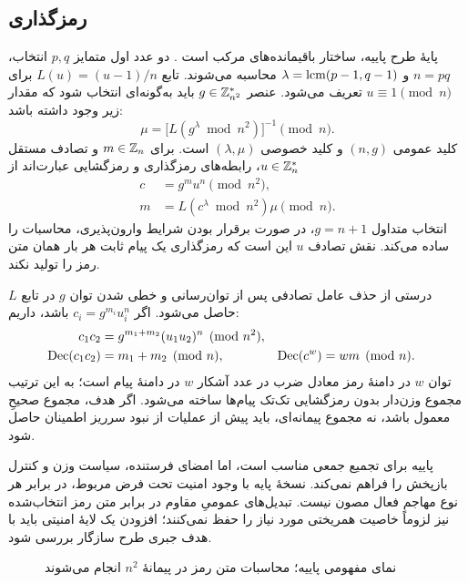 \subsection{رمزگذاری }
پایۀ طرح پاییه، ساختار باقیمانده‌های مرکب است \cite{ref179}. دو عدد اول متمایز $p,q$ انتخاب، $n=pq$ و $\lambda=\operatorname{lcm}(p-1,q-1)$ محاسبه می‌شوند. تابع $L(u)=(u-1)/n$ برای $u\equiv1\pmod n$ تعریف می‌شود. عنصر $g\in\mathbb{Z}_{n^2}^{*}$ باید به‌گونه‌ای انتخاب شود که مقدار زیر وجود داشته باشد:
\begin{equation}
\mu=\bigl[L(g^{\lambda}\bmod n^2)\bigr]^{-1}\pmod n.
\end{equation}
کلید عمومی $(n,g)$ و کلید خصوصی $(\lambda,\mu)$ است. برای $m\in\mathbb{Z}_n$ و تصادف مستقل $u\in\mathbb{Z}_n^*$، رابطه‌های رمزگذاری و رمزگشایی عبارت‌اند از
\begin{align}
c&=g^m u^n\pmod{n^2},\\
m&=L(c^{\lambda}\bmod n^2)\mu\pmod n.
\label{eq:paillier}
\end{align}
انتخاب متداول $g=n+1$، در صورت برقرار بودن شرایط وارون‌پذیری، محاسبات را ساده می‌کند. نقش تصادف $u$ این است که رمزگذاری یک پیام ثابت هر بار همان متن رمز را تولید نکند.

درستی از حذف عامل تصادفی پس از توان‌رسانی و خطی شدن توان $g$ در تابع $L$ حاصل می‌شود. اگر $c_i=g^{m_i}u_i^n$ باشد، داریم:
\begin{align}
c_1c_2&=g^{m_1+m_2}(u_1u_2)^n\pmod{n^2},\\
\operatorname{Dec}(c_1c_2)&=m_1+m_2\pmod n,&
\operatorname{Dec}(c^w)&=wm\pmod n.
\label{eq:paillier-homomorphism}
\end{align}
توان $w$ در دامنۀ رمز معادل ضرب در عدد آشکار $w$ در دامنۀ پیام است؛ به این ترتیب مجموع وزن‌دار بدون رمزگشایی تک‌تک پیام‌ها ساخته می‌شود. اگر هدف، مجموع صحیحِ معمول باشد، نه مجموع پیمانه‌ای، باید پیش از عملیات از نبود سرریز اطمینان حاصل شود.

پاییه برای تجمیع جمعی مناسب است، اما امضای فرستنده، سیاست وزن و کنترل بازپخش را فراهم نمی‌کند. نسخۀ پایه با وجود امنیت تحت فرض مربوط، در برابر هر نوع مهاجم فعال مصون نیست. تبدیل‌های عمومیِ مقاوم در برابر متن رمز انتخاب‌شده نیز لزوماً خاصیت همریختی مورد نیاز را حفظ نمی‌کنند؛ افزودن یک لایۀ امنیتی باید با هدف جبری طرح سازگار بررسی شود.
\begin{figure}[htbp]
\centering
\caption{نمای مفهومی پاییه؛ محاسبات متن رمز در پیمانۀ $n^2$ انجام می‌شوند}
\label{fig:paillier}
\end{figure}

